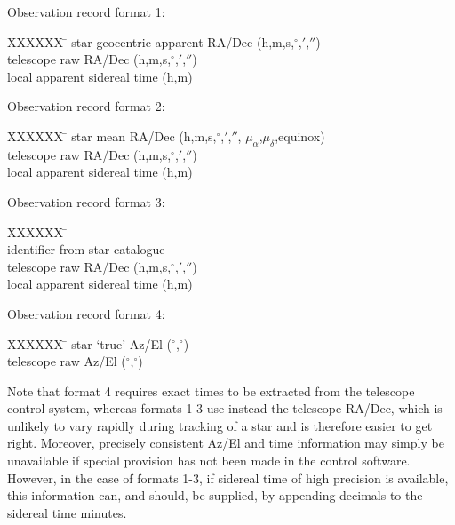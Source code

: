 \hspace{2em} Observation record format 1:
\begin{tabs}
XXXXXX \= \kill
\> star geocentric apparent RA/Dec (h,m,s,$^\circ$,$'$,$''$) \\
\> telescope raw RA/Dec (h,m,s,$^\circ$,$'$,$''$) \\
\> local apparent sidereal time (h,m) \\
\end{tabs}
\hspace{2em} Observation record format 2:
\begin{tabs}
XXXXXX \= \kill
\> star mean RA/Dec (h,m,s,$^\circ$,$'$,$''$,
                     $\mu_\alpha$,$\mu_\delta$,equinox) \\
\> telescope raw RA/Dec (h,m,s,$^\circ$,$'$,$''$) \\
\> local apparent sidereal time (h,m) \\
\end{tabs}
\hspace{2em} Observation record format 3:
\begin{tabs}
XXXXXX \= \kill
\> \fstring{*} \\
\> identifier from star catalogue \\
\> telescope raw RA/Dec (h,m,s,$^\circ$,$'$,$''$) \\
\> local apparent sidereal time (h,m) \\
\end{tabs}
\hspace{2em} Observation record format 4:
\begin{tabs}
XXXXXX \= \kill
\> star `true' Az/El ($^\circ$,$^\circ$) \\
\> telescope raw Az/El ($^\circ$,$^\circ$) \\
\end{tabs}
Note that format 4 requires exact
times to be extracted from the telescope control
system, whereas formats 1-3 use instead the telescope RA/Dec,
which is unlikely to vary rapidly during tracking of a star
and is therefore easier to get right.
Moreover, precisely
consistent Az/El and time information may simply be
unavailable if special provision has not
been made in the control software.  However, in the case of
formats 1-3, if sidereal
time of high precision is available, this information can, and
should, be supplied, by appending decimals to the sidereal
time minutes.

